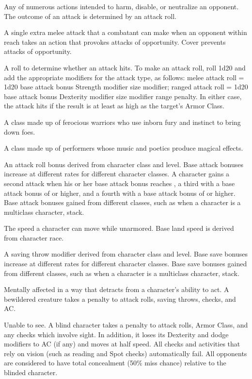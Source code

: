  Any of numerous 
actions intended to harm, disable, or neutralize an opponent. 
The outcome of an attack is 
determined by an attack roll. 

  A single extra melee attack that a combatant can 
make when an opponent within 
reach takes an action that provokes 
attacks of opportunity. Cover prevents attacks of opportunity. 

 A roll to determine 
whether an attack hits. To make 
an attack roll, roll 1d20 and add 
the appropriate modifiers for the 
attack type, as follows: melee attack roll 
= 1d20 \add base attack bonus \add Strength modifier \add size modifier; ranged attack roll = 1d20 \add 
base attack bonus \add Dexterity modifier \add size modifier \add range penalty. In either case, the attack hits if 
the result is at least as high as the target's Armor Class. 

 A class made up of ferocious warriors who use 
inborn fury and instinct to bring down foes. 

 A class made up of performers whose music and 
poetics produce magical effects. 

 An attack roll bonus derived from character 
class and level. Base attack bonuses increase at different rates for 
different character classes. A character gains a second attack when 
his or her base attack bonus reaches , a third with a base attack 
bonus of  or higher, and a fourth with a base attack bonus of  
or higher. Base attack bonuses gained from different classes, such as 
when a character is a multiclass character, stack. 

 The speed a character can move while unarmored. Base land speed is derived from character race. 

 A saving throw modifier derived from character class and level. Base save bonuses increase at different rates for 
different character classes. Base save bonuses gained from 
different classes, such as when a character is a multiclass 
character, stack. 

 Mentally affected in a way that detracts from a character's ability to act. A bewildered creature takes a  penalty to attack rolls, saving throws, checks, and AC.

 Unable to see. A blind character takes a  penalty to attack rolls, Armor Class, and any checks which involve sight. In addition, it loses its Dexterity and dodge modifiers to AC (if any) and moves at half speed. All checks and activities that rely on vision (such as reading and Spot checks) automatically fail. All opponents are considered to have total concealment (50\% miss chance) relative to the blinded character. 

